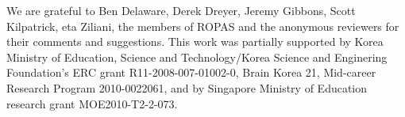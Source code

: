 \documentclass[acmlarge, anonymous, review]{acmart}
\begin{document}

\begin{acks}
We are grateful to Ben Delaware, Derek Dreyer, Jeremy Gibbons, Scott
Kilpatrick, eta Ziliani, the members of ROPAS and the
anonymous reviewers for their comments and suggestions.  This work was
partially supported by Korea Ministry of Education, Science and
Technology/Korea Science and Enginering Foundation's ERC grant
R11-2008-007-01002-0, Brain Korea 21, Mid-career Research Program 2010-0022061, and
by Singapore Ministry of Education research grant MOE2010-T2-2-073.
\end{acks}






\end{document}
